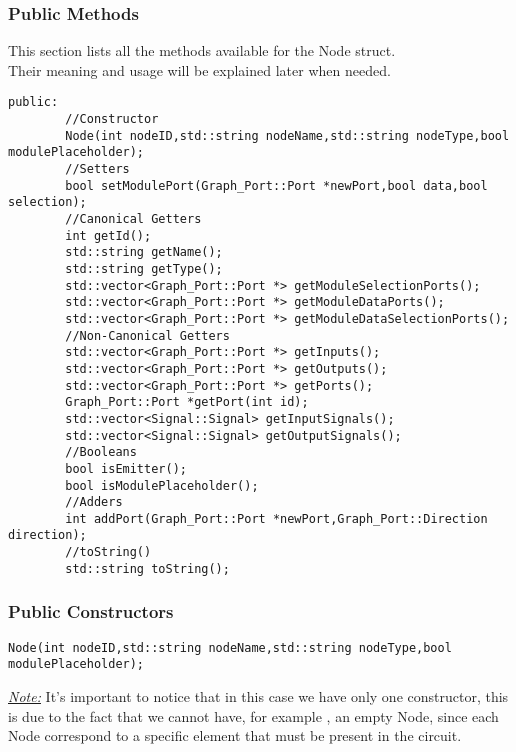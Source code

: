 \documentclass{article}
\begin{document}
\subsubsection{Public Methods}

This section lists all the methods available for the Node struct.\\
Their meaning and usage will be explained later when needed.\\

\begin{mdframed}[hidealllines=true, backgroundcolor=magenta!10]
	\begin{lstlisting}[basicstyle=\tiny]
	public:
		//Constructor
		Node(int nodeID,std::string nodeName,std::string nodeType,bool modulePlaceholder);
		//Setters
		bool setModulePort(Graph_Port::Port *newPort,bool data,bool selection);
		//Canonical Getters
		int getId();
		std::string getName();
		std::string getType();
		std::vector<Graph_Port::Port *> getModuleSelectionPorts();
		std::vector<Graph_Port::Port *> getModuleDataPorts();
		std::vector<Graph_Port::Port *> getModuleDataSelectionPorts();
		//Non-Canonical Getters
		std::vector<Graph_Port::Port *> getInputs();
		std::vector<Graph_Port::Port *> getOutputs();
		std::vector<Graph_Port::Port *> getPorts();
		Graph_Port::Port *getPort(int id);
		std::vector<Signal::Signal> getInputSignals();
		std::vector<Signal::Signal> getOutputSignals();
		//Booleans
		bool isEmitter();
		bool isModulePlaceholder();
		//Adders
		int addPort(Graph_Port::Port *newPort,Graph_Port::Direction direction);
		//toString()
		std::string toString();
	\end{lstlisting}
\end{mdframed}

\subsubsection{Public Constructors}

\begin{mdframed}[hidealllines=true, backgroundcolor=magenta!10]
	\begin{lstlisting}
Node(int nodeID,std::string nodeName,std::string nodeType,bool modulePlaceholder);
	\end{lstlisting}
\end{mdframed}

\underline{\textit{Note:}} It's important to notice that in this case we have only one constructor, this is due to the fact that 
we cannot have, for example , an empty Node, since each Node correspond to a specific element that must be present in the circuit.\\
\end{document}
